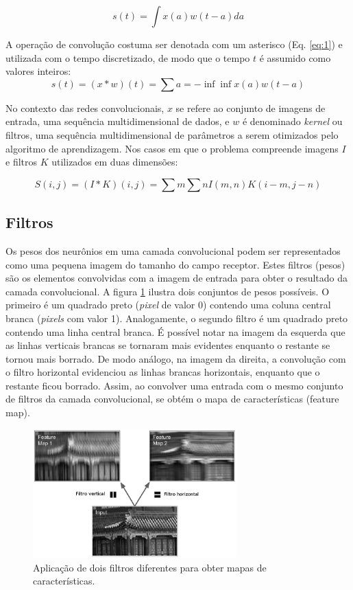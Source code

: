 \begin{equation}
 s(t) = \int{x(a) w(t-a)da}
 \label{eq:1}
\end{equation}

A operação de convolução costuma ser denotada com um asterisco (Eq. \ref{eq:1}) e utilizada com o tempo
discretizado, de modo que o tempo $t$ é assumido como valores inteiros:
\begin{equation}
 s(t) = (x * w)(t) = \sum{a=-\inf}{\inf}{x(a)w(t-a)}
 \label{eq:1}
\end{equation}

No contexto das redes convolucionais, $x$ se refere ao conjunto de imagens de entrada, uma sequência multidimensional
de dados, e $w$ é denominado \textit{kernel} ou filtros, uma sequência multidimensional de parâmetros 
a serem otimizados pelo algoritmo de aprendizagem.
Nos casos em que o problema compreende imagens $I$ e filtros $K$ utilizados em duas dimensões:

\begin{equation}
 S(i,j) = (I*K)(i,j) = \sum{m}\sum{n}{I(m,n)K(i-m,j-n)}
\end{equation}

\subsection{Filtros}
Os pesos dos neurônios em uma camada convolucional podem ser representados como uma pequena
imagem do tamanho do campo receptor. Estes filtros (pesos) são os elementos
convolvidas com a imagem de entrada para obter o resultado da camada convolucional.
A figura \ref{fig:conv_filt} ilustra dois conjuntos de pesos possíveis. O primeiro é um quadrado preto
(\textit{pixel} de valor 0) contendo uma coluna central branca (\textit{pixels} com valor 1). 
Analogamente, o segundo filtro é um quadrado preto contendo uma linha central branca.
É possível notar na imagem da esquerda que as linhas verticais brancas se tornaram mais evidentes enquanto o restante
se tornou mais borrado. De modo análogo, na imagem da direita, a convolução com o filtro horizontal evidenciou as linhas brancas horizontais, enquanto que
o restante ficou borrado. Assim, ao convolver uma entrada com o mesmo conjunto de filtros da camada convolucional, se obtém
o mapa de características (feature map).
\begin{figure}[htp]
\begin{center}
  \includegraphics[width=0.7\textwidth]{fig/conv_filt}
  \caption{Aplicação de dois filtros diferentes para obter mapas de características.}
  \label{fig:conv_filt}
\end{center}
\end{figure}

